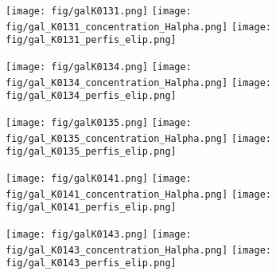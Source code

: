 \begin{figure}[!ht]
\begin{center}
\setcaptionmargin{1cm}
\texttt{[image: fig/galK0131.png]}
\texttt{[image: fig/gal\_K0131\_concentration\_Halpha.png]}
\texttt{[image: fig/gal\_K0131\_perfis\_elip.png]}
\end{center}
\end{figure}


\begin{figure}[!ht]
\begin{center}
\setcaptionmargin{1cm}
\texttt{[image: fig/galK0134.png]}
\texttt{[image: fig/gal\_K0134\_concentration\_Halpha.png]}
\texttt{[image: fig/gal\_K0134\_perfis\_elip.png]}
\end{center}
\end{figure}


\begin{figure}[!ht]
\begin{center}
\setcaptionmargin{1cm}
\texttt{[image: fig/galK0135.png]}
\texttt{[image: fig/gal\_K0135\_concentration\_Halpha.png]}
\texttt{[image: fig/gal\_K0135\_perfis\_elip.png]}
\end{center}
\end{figure}


\begin{figure}[!ht]
\begin{center}
\setcaptionmargin{1cm}
\texttt{[image: fig/galK0141.png]}
\texttt{[image: fig/gal\_K0141\_concentration\_Halpha.png]}
\texttt{[image: fig/gal\_K0141\_perfis\_elip.png]}
\end{center}
\end{figure}


\begin{figure}[!ht]
\begin{center}
\setcaptionmargin{1cm}
\texttt{[image: fig/galK0143.png]}
\texttt{[image: fig/gal\_K0143\_concentration\_Halpha.png]}
\texttt{[image: fig/gal\_K0143\_perfis\_elip.png]}
\end{center}
\end{figure}


